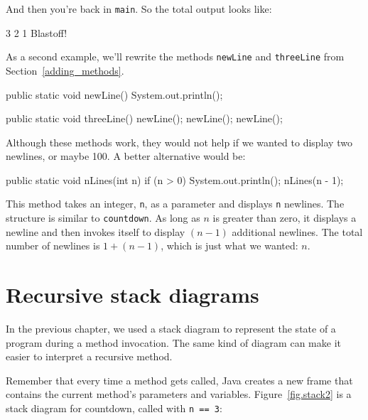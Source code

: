 \documentclass[12pt]{book}
\theoremstyle{exercise}
\newcommand{\java}[1]{\verb"#1"}
\begin{document}
And then you're back in \java{main}.
So the total output looks like:

\begin{stdout}
3
2
1
Blastoff!
\end{stdout}

As a second example, we'll rewrite the methods \java{newLine} and \java{threeLine} from Section~\ref{adding_methods}.

\begin{code}
    public static void newLine() {
        System.out.println();
    }

    public static void threeLine() {
        newLine();
        newLine();
        newLine();
    }
\end{code}


Although these methods work, they would not help if we wanted to display two newlines, or maybe 100.
A better alternative would be:

\begin{code}
    public static void nLines(int n) {
        if (n > 0) {
            System.out.println();
            nLines(n - 1);
        }
    }
\end{code}

This method takes an integer, \java{n}, as a parameter and displays \java{n} newlines.
The structure is similar to \java{countdown}.
As long as $n$ is greater than zero, it displays a newline and then invokes itself to display $(n-1)$ additional newlines.
The total number of newlines is $1 + (n - 1)$, which is just what we wanted: $n$.


\section{Recursive stack diagrams}


In the previous chapter, we used a stack diagram to represent the state of a program during a method invocation.
The same kind of diagram can make it easier to interpret a recursive method.

Remember that every time a method gets called, Java creates a new frame that contains the current method's parameters and variables.
Figure~\ref{fig.stack2} is a stack diagram for countdown, called with \java{n == 3}:
\end{document}
